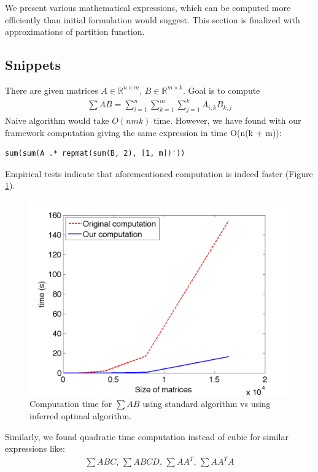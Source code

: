 We present various mathematical expressions, which can be computed more efficiently
than initial formulation would suggest. This section is finalized with  
approximations of partition function. 

\subsection{Snippets}

There are given matrices $A \in \mathbb{R}^{n \times m}$, $B \in \mathbb{R}^{m \times k}$. 
Goal is to compute 
\begin{gather*}
\sum AB = \sum_{i = 1}^n \sum_{k = 1}^m \sum_{j = 1}^k A_{i, k} B_{k, j} 
\end{gather*}
Naive algorithm would take $O(nmk)$ time. However, we have found with our framework 
computation giving the same expression in time O(n(k + m)):
\begin{lstlisting}
sum(sum(A .* repmat(sum(B, 2), [1, m])'))
\end{lstlisting}
Empirical tests indicate that aforementioned computation is indeed faster (Figure \ref{ab}).

\begin{figure}[h]
\centering
\includegraphics[scale=0.3]{img/ab.png}
\caption{Computation time for $\sum AB$ using standard algorithm vs using inferred optimal algorithm.}
\label{ab}
\end{figure}


Similarly, we found quadratic time computation instead of cubic for similar expressions like: 
\begin{align*}
	\sum ABC\text{, }\sum ABCD\text{, }\sum AA^T\text{, }\sum AA^TA
\end{align*}

